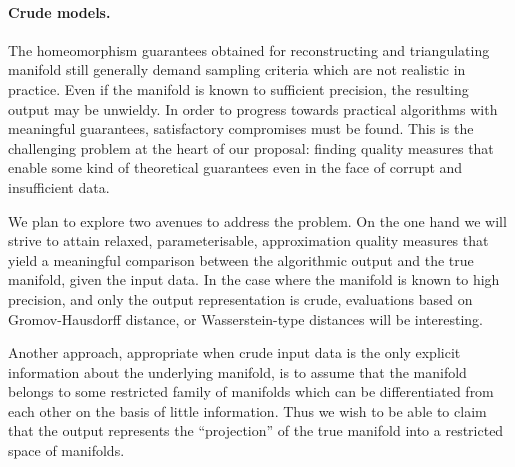\paragraph{Crude models.}

The homeomorphism guarantees obtained for reconstructing and
triangulating manifold still generally demand sampling criteria which
are not realistic in practice. Even if the manifold is known to
sufficient precision, the resulting output may be
unwieldy. In order to progress towards practical algorithms with
meaningful guarantees, satisfactory compromises must be found. 
%
%
This is the challenging problem at the heart of our proposal: finding
quality measures that enable some kind of theoretical guarantees even
in the face of corrupt and insufficient data. 

We plan to explore two avenues to address the problem. On the one
hand we will strive to attain relaxed, parameterisable, approximation quality
measures that yield a meaningful comparison between the algorithmic
output and the true manifold, given the input data. In the case where
the manifold is known to high precision, and only the output
representation is crude, evaluations based on Gromov-Hausdorff
distance, or Wasserstein-type distances will be interesting.

Another approach, appropriate when crude input data is the only
explicit information about the underlying manifold, is to assume that
the manifold belongs to some restricted family of manifolds which can
be differentiated from each other on the basis of little
information. Thus we wish to be able to claim that the output
represents the ``projection'' of the true manifold into a restricted
space of manifolds.

